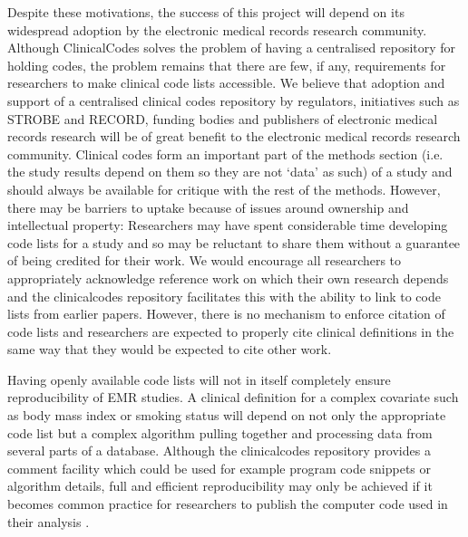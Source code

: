\documentclass[10pt]{article}
\begin{document}
Despite these motivations, the success of this project will depend on its widespread adoption by the electronic medical records research community.  Although ClinicalCodes solves the problem of having a centralised repository for holding codes, the problem remains that there are few, if any, requirements for researchers to make clinical code lists accessible. We believe that adoption and support of a centralised clinical codes repository by regulators, initiatives such as STROBE and RECORD, funding bodies and publishers of electronic medical records research will be of great benefit to the electronic medical records research community. Clinical codes form an important part of the methods section (i.e. the study results depend on them so they are not `data' as such) of a study and should always be available for critique with the rest of the methods.  However, there may be barriers to uptake because of issues around ownership and intellectual property: Researchers may have spent considerable time developing code lists for a study and so may be reluctant to share them without a guarantee of being credited for their work. We would encourage all researchers to appropriately acknowledge reference work on which their own research depends and the clinicalcodes repository facilitates this with the ability to link to code lists from earlier papers. However, there is no mechanism to enforce citation of code lists and researchers are expected to properly cite clinical definitions in the same way that they would be expected to cite other work. 

Having openly available code lists will not in itself completely ensure reproducibility of EMR studies. A clinical definition for a complex covariate such as body mass index or smoking status will depend on not only the appropriate code list but a complex algorithm pulling together and processing data from several parts of a database.  Although the clinicalcodes repository provides a comment facility which could be used for example program code snippets or algorithm details, full and efficient reproducibility may only be achieved if it becomes common practice for researchers to publish the computer code used in their analysis \cite{Morin2012}.
\end{document}
